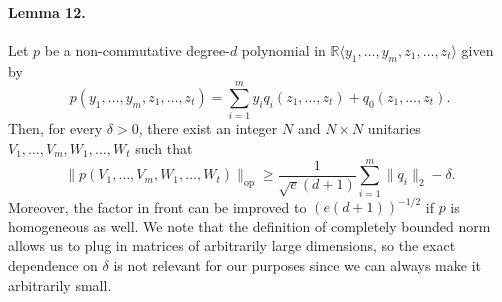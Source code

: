 \paragraph{Lemma 12.}
Let $p$ be a non-commutative degree-$d$ polynomial in $\mathbb R\langle y_1,\ldots,y_m,z_1,\ldots,z_t\rangle$ given by
\[p(y_1,\ldots,y_m,z_1,\ldots,z_t)=\sum_{i=1}^my_iq_i(z_1,\ldots,z_t)+q_0(z_1,\ldots,z_t).\]
Then, for every $\delta>0$, there exist an integer $N$ and $N\times N$ unitaries $V_1,\ldots,V_m,W_1,\ldots,W_t$ such that
\[\|p(V_1,\ldots,V_m,W_1,\ldots,W_t)\|_{\mathrm{op}}\geq\frac1{\sqrt e(d+1)}\sum_{i=1}^m\|q_i\|_2-\delta.\]
Moreover, the factor in front can be improved to $(e(d+1))^{-1/2}$ if $p$ is homogeneous as well.
We note that the definition of completely bounded norm allows us to plug in matrices of arbitrarily large dimensions, so the exact dependence on $\delta$ is not relevant for our purposes since we can always make it arbitrarily small.
